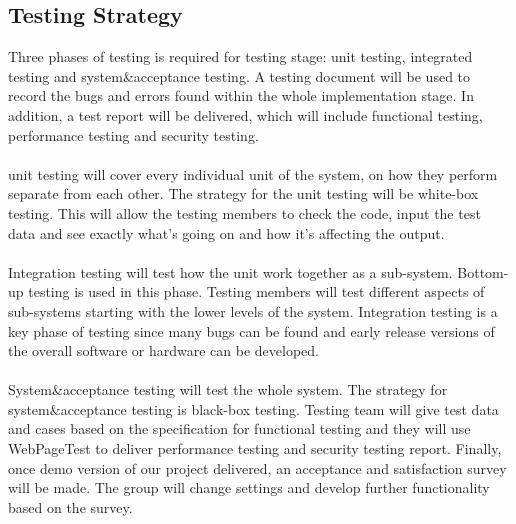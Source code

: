 \documentclass[12pt]{article}
\begin{document}
\subsection{Testing Strategy}
Three phases of testing is required for testing stage: unit testing, integrated testing and system\&acceptance testing. A testing document will be used to record the bugs and errors found within the whole implementation stage. In addition, a test report will be delivered, which will include functional testing, performance testing and security testing.\\\\
unit testing will cover every individual unit of the system, on how they perform separate from each other. The strategy for the unit testing will be white-box testing. This will allow the testing members to check the code, input the test data and see exactly what’s going on and how it’s affecting the output. \\\\
Integration testing will test how the unit work together as a sub-system. Bottom-up testing is used in this phase. Testing members will test different aspects of sub-systems starting with the lower levels of the system. Integration testing is a key phase of testing since many bugs can be found and early release versions of the overall software or hardware can be developed.\\\\
System\&acceptance testing will test the whole system. The strategy for system\&acceptance testing is black-box testing. Testing team will give test data and cases based on the specification for functional testing and they will use WebPageTest to deliver performance testing and security testing report. Finally, once demo version of our project delivered, an acceptance and satisfaction survey will be made. The group will change settings and develop further functionality based on the survey.
\end{document}
